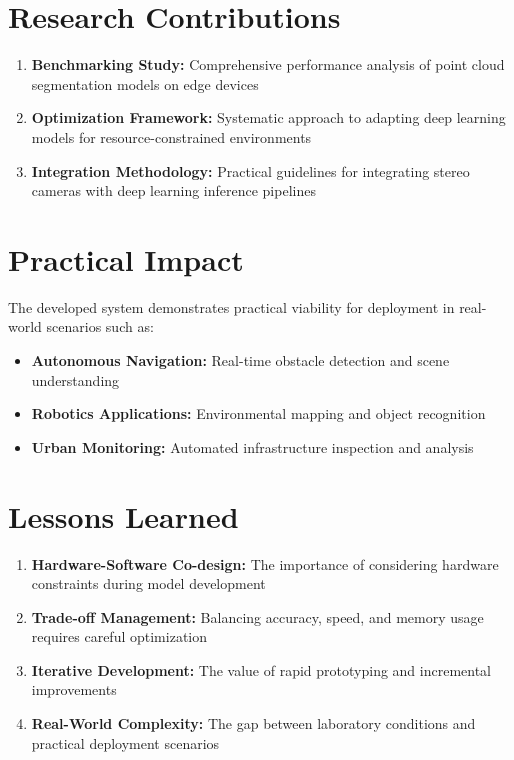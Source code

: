 \documentclass[12pt,a4paper]{report}
\begin{document}
\section{Research Contributions}

\begin{enumerate}
    \item \textbf{Benchmarking Study:} Comprehensive performance analysis of point cloud segmentation models on edge devices
    \item \textbf{Optimization Framework:} Systematic approach to adapting deep learning models for resource-constrained environments
    \item \textbf{Integration Methodology:} Practical guidelines for integrating stereo cameras with deep learning inference pipelines
\end{enumerate}

\section{Practical Impact}

The developed system demonstrates practical viability for deployment in real-world scenarios such as:

\begin{itemize}
    \item \textbf{Autonomous Navigation:} Real-time obstacle detection and scene understanding
    \item \textbf{Robotics Applications:} Environmental mapping and object recognition
    \item \textbf{Urban Monitoring:} Automated infrastructure inspection and analysis
\end{itemize}

\section{Lessons Learned}

\begin{enumerate}
    \item \textbf{Hardware-Software Co-design:} The importance of considering hardware constraints during model development
    \item \textbf{Trade-off Management:} Balancing accuracy, speed, and memory usage requires careful optimization
    \item \textbf{Iterative Development:} The value of rapid prototyping and incremental improvements
    \item \textbf{Real-World Complexity:} The gap between laboratory conditions and practical deployment scenarios
\end{enumerate}
\end{document}
